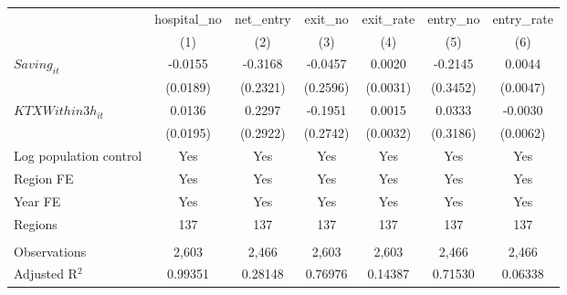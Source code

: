 \begingroup
\centering
\begin{tabular}{lcccccc}
   \toprule
                          & hospital\_no  & net\_entry  & exit\_no  & exit\_rate  & entry\_no  & entry\_rate \\    
                          & (1)           & (2)         & (3)       & (4)         & (5)        & (6)\\  
   \midrule 
   $Saving_{it}$          & -0.0155       & -0.3168     & -0.0457   & 0.0020      & -0.2145    & 0.0044\\   
                          & (0.0189)      & (0.2321)    & (0.2596)  & (0.0031)    & (0.3452)   & (0.0047)\\   
   $KTXWithin3h_{it}$     & 0.0136        & 0.2297      & -0.1951   & 0.0015      & 0.0333     & -0.0030\\   
                          & (0.0195)      & (0.2922)    & (0.2742)  & (0.0032)    & (0.3186)   & (0.0062)\\   
   Log population control & Yes           & Yes         & Yes       & Yes         & Yes        & Yes\\  
   Region FE              & Yes           & Yes         & Yes       & Yes         & Yes        & Yes\\  
   Year FE                & Yes           & Yes         & Yes       & Yes         & Yes        & Yes\\  
   Regions                & 137           & 137         & 137       & 137         & 137        & 137\\  
    \\
   Observations           & 2,603         & 2,466       & 2,603     & 2,603       & 2,466      & 2,466\\  
   Adjusted R$^2$         & 0.99351       & 0.28148     & 0.76976   & 0.14387     & 0.71530    & 0.06338\\  
   \bottomrule
\end{tabular}
\par\endgroup
